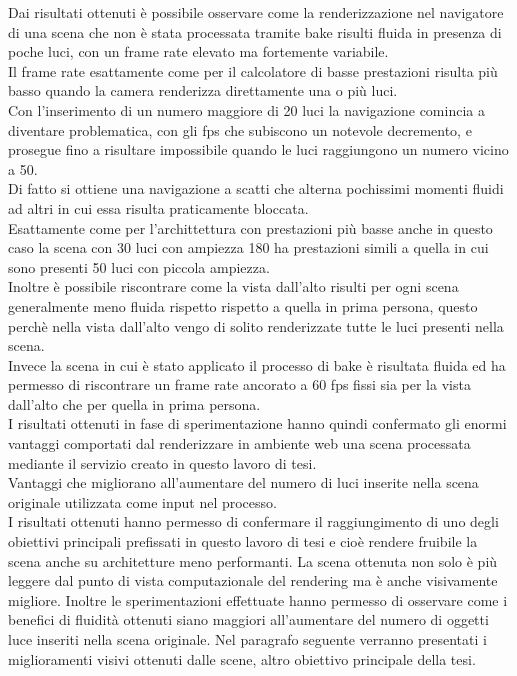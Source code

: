 Dai risultati ottenuti è possibile osservare come la renderizzazione nel navigatore di una scena che non è stata processata tramite bake risulti fluida in presenza di poche luci, con un frame rate elevato ma fortemente variabile.
\\ 
Il frame rate esattamente come per il calcolatore di basse prestazioni risulta più basso quando la camera renderizza direttamente una o più luci.
\\
Con l’inserimento di un numero maggiore di 20 luci la navigazione comincia a diventare problematica, con gli fps che subiscono un notevole decremento, e prosegue fino a risultare impossibile quando le luci raggiungono un numero vicino a 50.
\\
Di fatto si ottiene una navigazione a scatti che alterna pochissimi momenti fluidi ad altri in cui essa risulta praticamente bloccata.
\\
Esattamente come per l’archittettura con prestazioni più basse anche in questo caso la scena con 30 luci con ampiezza 180 ha prestazioni simili a quella in cui sono presenti 50 luci con piccola ampiezza.
\\
Inoltre è possibile riscontrare come la vista dall’alto risulti per ogni scena generalmente meno fluida rispetto rispetto a quella in prima persona, questo perchè nella vista dall’alto vengo di solito renderizzate tutte le luci presenti nella scena.
\\
Invece la scena in cui è stato applicato il processo di bake è risultata fluida ed ha permesso di riscontrare un frame rate ancorato a 60 fps fissi sia per la vista dall’alto che per quella in prima persona.
\\
I risultati ottenuti in fase di sperimentazione hanno quindi confermato gli enormi vantaggi comportati dal renderizzare in ambiente web una scena processata mediante il servizio creato in questo lavoro di tesi.
\\
Vantaggi che  migliorano all’aumentare del numero di luci inserite nella scena originale utilizzata come input nel processo.
\\
I risultati ottenuti hanno permesso di confermare il raggiungimento di uno degli obiettivi principali prefissati in questo lavoro di tesi e cioè rendere fruibile la scena anche su architetture meno performanti.
La scena ottenuta non solo è più leggere dal punto di vista computazionale del rendering ma è anche visivamente migliore.
Inoltre le sperimentazioni effettuate hanno permesso di osservare come i benefici di fluidità ottenuti siano maggiori all'aumentare del numero di oggetti luce inseriti nella scena originale.
Nel paragrafo seguente verranno presentati i miglioramenti visivi ottenuti dalle scene, altro obiettivo principale della tesi.

